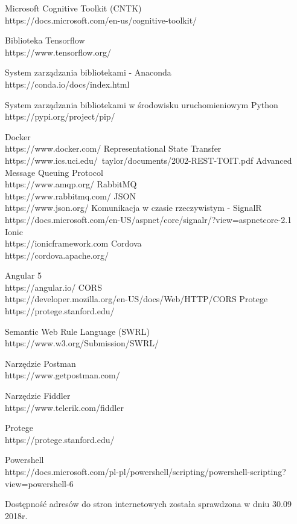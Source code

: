 \begin{thebibliography}{1}
 Microsoft Cognitive Toolkit (CNTK)
\\
https://docs.microsoft.com/en-us/cognitive-toolkit/

 Biblioteka Tensorflow
\\
https://www.tensorflow.org/

 System zarządzania bibliotekami - Anaconda
\\
https://conda.io/docs/index.html

 System zarządzania bibliotekami w środowisku uruchomieniowym Python
\\
https://pypi.org/project/pip/


 Docker
\\
https://www.docker.com/
 Representational State Transfer
\\
https://www.ics.uci.edu/~taylor/documents/2002-REST-TOIT.pdf
Advanced Message Queuing Protocol
\\
https://www.amqp.org/
 RabbitMQ
\\
https://www.rabbitmq.com/
 JSON
\\
https://www.json.org/
 Komunikacja w czasie rzeczywistym - SignalR
\\
https://docs.microsoft.com/en-US/aspnet/core/signalr/?view=aspnetcore-2.1
 Ionic
\\
https://ionicframework.com
 Cordova
\\
https://cordova.apache.org/

 Angular 5
\\
https://angular.io/
CORS
\\
https://developer.mozilla.org/en-US/docs/Web/HTTP/CORS
Protege
\\
https://protege.stanford.edu/

Semantic Web Rule Language (SWRL)
\\
https://www.w3.org/Submission/SWRL/

Narzędzie Postman
\\
https://www.getpostman.com/


Narzędzie Fiddler
\\
https://www.telerik.com/fiddler

 Protege
\\
https://protege.stanford.edu/

 Powershell
\\
https://docs.microsoft.com/pl-pl/powershell/scripting/powershell-scripting?view=powershell-6

\end{thebibliography}

Dostępność adresów do stron internetowych została sprawdzona w dniu 30.09 2018r.